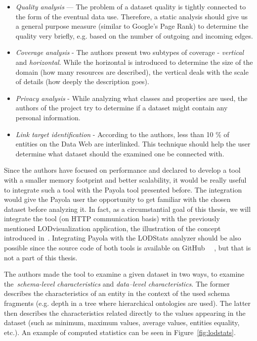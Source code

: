 \begin{itemize}
  \item \emph{Quality analysis} --- The problem of a dataset quality is tightly connected 
  to the form of the eventual data use. Therefore, a static analysis should 
  give us a general purpose measure (similar to Google's Page Rank) to determine the 
  quality very briefly, e.g. based on the number of outgoing and incoming 
  edges.
  
  \item \emph{Coverage analysis} - The authors present two subtypes of 
  coverage - \emph{vertical} and \emph{horizontal}.  While the horizontal is 
  introduced to determine the size of the domain (how many resources are described),
  the vertical deals with the scale of details (how deeply the description goes).
  
  \item \emph{Privacy analysis} - While analyzing what classes and properties 
  are used, the authors of the project try to determine if a dataset 
  might contain any personal information.
  
  \item \emph{Link target identification} - According to the authors, less than 
  10 \% of entities on the Data Web are interlinked. This technique 
  should help the user determine what dataset should the examined one be 
  connected with.
\end{itemize}

Since the authors have focused on performance and declared to develop a 
tool with a smaller memory footprint and better scalability, it 
would be really useful to integrate such a tool with the Payola tool presented 
before. The integration would give the Payola user the opportunity to get familiar with the 
chosen dataset before analyzing it. In fact, as a circumstantial goal of this 
thesis, we will integrate the tool (on HTTP communication basis) with the previously mentioned 
LODvisualization application, the illustration of the concept introduced 
in~\cite{ldvm}. Integrating Payola with the LODStats analyzer should be also 
possible since the source code of both tools is available on GitHub~\cite{github-payola} 
~\cite{github-lodstats}, but that is not a part of this thesis.

The authors made the tool to examine a given dataset in two ways, to examine 
the~\emph{schema-level characteristics} and \emph{data--level characteristics}. 
The former describes the characteristics of an entity in the context of the used 
schema fragments (e.g. depth in a tree where hierarchical ontologies are used). 
The latter then describes the characteristics related directly to the values 
appearing in the dataset (such as minimum, maximum values, average values, entities equality, 
etc.). An example of computed statistics can be seen in 
Figure~\ref{fig:lodstats}.


